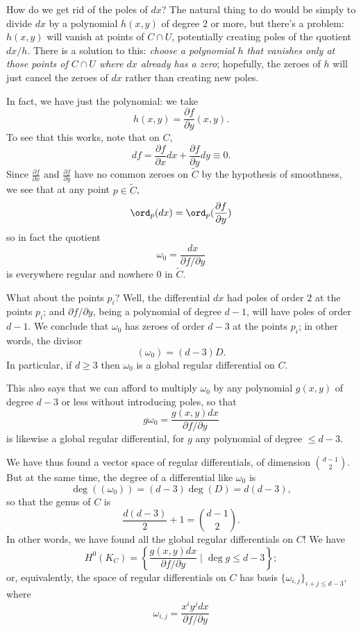  How do we get rid of the poles of $dx$? The natural thing to do would be simply to divide $dx$ by a polynomial $h(x,y)$ of degree 2 or more, but there's a problem: $h(x,y)$ will vanish at points of $C \cap U$, potentially creating poles of the quotient $dx/h$. There is a solution to this: \emph{choose a polynomial $h$ that vanishes only at those points of $C \cap U$ where $dx$ already has a zero}; hopefully, the zeroes of $h$ will just cancel the zeroes of $dx$ rather than creating new poles.
 
 In fact, we have just the polynomial: we take
 $$
 h(x,y) = \frac{\partial f}{\partial y}(x,y).
 $$
 To see that this works, note that on $C$,
 $$
 df = \frac{\partial f}{\partial x}dx + \frac{\partial f}{\partial y}dy \equiv 0.
 $$
Since $\frac{\partial f}{\partial x}$ and $\frac{\partial f}{\partial y}$ have no common zeroes on $\tilde C$ by the hypothesis of smoothness, we see that at any point $p \in \tilde C$,
$$
\ord_p(dx) = \ord_p(\frac{\partial f}{\partial y})
$$ 
so in fact the quotient 
$$
\omega_0 = \frac{dx}{\partial f/\partial y}
$$
is everywhere regular and nowhere 0 in $\tilde C$.

What about the points $p_i$? Well, the differential $dx$ had poles of order $2$ at the points $p_i$; and $\partial f/\partial y$, being a polynomial of degree $d-1$, will have poles of order $d-1$. We conclude that $\omega_0$ has zeroes of order $d-3$ at the points $p_i$; in other words, the divisor
$$
(\omega_0) = (d-3)D.
$$
In particular, if $d \geq 3$ then $\omega_0$ is a global regular differential on $C$.

This also says that we can afford to multiply $\omega_0$ by any polynomial $g(x,y)$ of degree $d-3$ or less without introducing poles, so that 
$$
g\omega_0 = \frac{g(x,y)dx}{\partial f/\partial y}
$$ 
is likewise a global regular differential, for $g$  any polynomial of degree $\leq d-3$.

We have thus found a vector space of regular differentials, of dimension $\binom{d-1}{2}$. But at the same time, the degree of a differential like $\omega_0$ is
$$
\deg((\omega_0)) = (d-3)\deg(D) = d(d-3),
$$
so that the genus of $C$ is 
$$
\frac{d(d-3)}{2} + 1 = \binom{d-1}{2}.
$$
In other words, we have found all the global regular differentials on $C$! We have
$$
H^0(K_C) = \left\{ \frac{g(x,y)dx}{\partial f/\partial y} \mid \deg g \leq d-3\right\};
$$
or, equivalently, the space of regular differentials on $C$ has basis $\{\omega_{i,j} \}_{i+j \leq d-3}$, where
$$
\omega_{i,j} =  \frac{x^iy^jdx}{\partial f/\partial y}
$$

